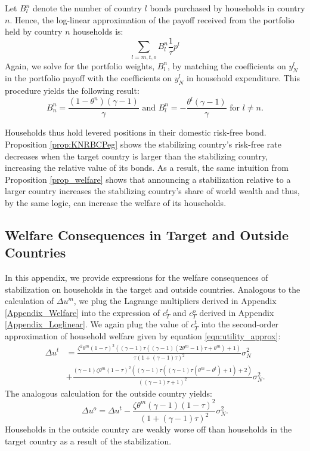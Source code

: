Let $B^n_l$ denote the number of country $l$ bonds purchased by
households in country $n$. Hence, the log-linear approximation of the
payoff received from the portfolio held by country $n$ households is:
\begin{equation*}
  \sum_{l = m, t, o} B_l^n \frac{1}{\tau} p^l
\end{equation*}
Again, we solve for the portfolio weights, $B^n_l$, by matching the
coefficients on $y^l_N$ in the portfolio payoff with the coefficients
on $y^l_N$ in household expenditure. This procedure yields the
following result:
\begin{equation*}
  B_n^n = \frac{(1 - \theta^n)(\gamma - 1)}{\gamma} \text{ and }
  B_l^n = - \frac{\theta^l (\gamma - 1)}{\gamma} \text{ for } l \neq n.
\end{equation*}

Households thus hold levered positions in their domestic risk-free
bond. Proposition \ref{prop:KNRBCPeg} shows the stabilizing country's
risk-free rate decreases when the target country is larger than the
stabilizing country, increasing the relative value of its bonds. As a
result, the same intuition from Proposition \ref{prop_welfare} shows
that announcing a stabilization relative to a larger country increases
the stabilizing country's share of world wealth and thus, by the same
logic, can increase the welfare of its households.

\subsection{Welfare Consequences in Target and Outside Countries
  \label{Appendix_Welfare_TO}}

In this appendix, we provide expressions for the welfare consequences
of stabilization on households in the target and outside countries.
Analogous to the calculation of $\Delta u^m$, we plug the Lagrange
multipliers derived in Appendix \ref{Appendix_Welfare} into the
expression of $c^t_T$ and $c^o_T$ derived in Appendix
\ref{Appendix_Loglinear}. We again plug the value of $c^t_T$ into the
second-order approximation of household welfare given by equation
\eqref{eqn:utility_approx}:
\begin{equation*}
  \begin{split}
    \Delta u^t & = \frac{\zeta^2 \theta^m (1 - \tau)^2 ((\gamma -1)
      \tau ((\gamma -1) (2 \theta^m - 1) \tau
      + \theta^m) + 1)}{\tau  (1 + (\gamma -1) \tau)^2} \sigma^2_N \\
    & + \frac{(\gamma -1) \zeta \theta^m (1 - \tau)^2 ((\gamma -1)
      \tau ((\gamma -1) \tau (\theta^m - \theta^t) + 1) + 2)}{((\gamma
      -1) \tau + 1)^2} \sigma^2_N.
  \end{split}
\end{equation*}
The analogous calculation for the outside country yields:
\begin{equation*} \Delta u^o = \Delta u^t - \frac{\zeta \theta^m
    (\gamma - 1)(1 - \tau)^2} {\left( 1 + (\gamma - 1) \tau\right)^2}
  \sigma_N^2.
\end{equation*}
Households in the outside country are weakly worse off than households
in the target country as a result of the stabilization.

